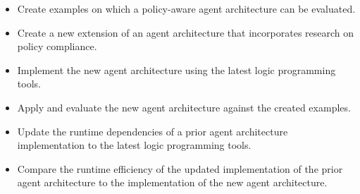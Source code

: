 \begin{itemize}
    \item Create examples on which a policy-aware agent architecture can be evaluated.
    \item Create a new extension of an agent architecture that incorporates research on policy compliance.
    \item Implement the new agent architecture using the latest logic programming tools.
    \item Apply and evaluate the new agent architecture against the created examples.
    \item Update the runtime dependencies of a prior agent architecture implementation to the latest logic programming tools.
    \item Compare the runtime efficiency of the updated implementation of the prior agent architecture to the implementation of the new agent architecture.
\end{itemize}
